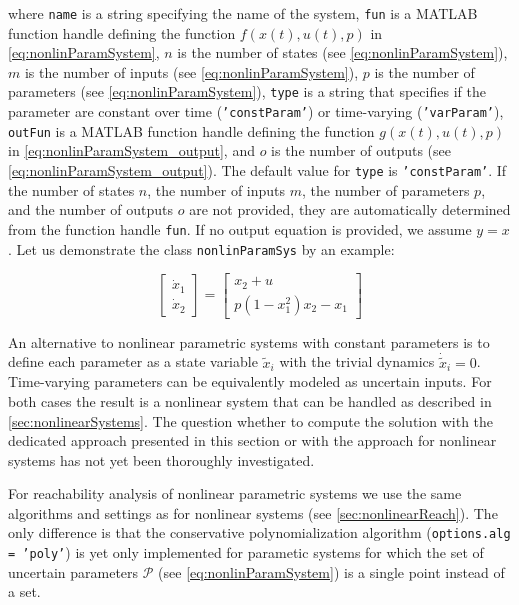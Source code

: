 where \texttt{name} is a string specifying the name of the system, \texttt{fun} is a MATLAB function handle defining the function $f(x(t),u(t),p)$ in \eqref{eq:nonlinParamSystem}, $n$ is the number of states (see \eqref{eq:nonlinParamSystem}), $m$ is the number of inputs (see \eqref{eq:nonlinParamSystem}), $p$ is the number of parameters (see \eqref{eq:nonlinParamSystem}), \texttt{type} is a string that specifies if the parameter are constant over time (\texttt{'constParam'}) or time-varying (\texttt{'varParam'}), \texttt{outFun} is a MATLAB function handle defining the function $g(x(t),u(t),p)$ in \eqref{eq:nonlinParamSystem_output}, and $o$ is the number of outputs (see \eqref{eq:nonlinParamSystem_output}). The default value for \texttt{type} is \texttt{'constParam'}. If the number of states $n$, the number of inputs $m$, the number of parameters $p$, and the number of outputs $o$ are not provided, they are automatically determined from the function handle \texttt{fun}. If no output equation is provided, we assume $y = x$. Let us demonstrate the class \texttt{nonlinParamSys} by an example:

\begin{center}
\begin{minipage}[t]{0.48\textwidth}
	\vspace{10pt}
	\begin{equation*}
	\begin{bmatrix} \dot x_1 \\ \dot x_2 \end{bmatrix} = \begin{bmatrix}  x_2 + u \\ p(1-x_1^2)x_2 - x_1 \end{bmatrix}
\end{equation*}
\end{minipage}
\begin{minipage}[t]{0.48\textwidth}
	\footnotesize
	
\end{minipage}
\end{center}

An alternative to nonlinear parametric systems with constant parameters is to define each parameter as a state variable $\tilde{x}_i$ with the trivial dynamics $\dot{\tilde{x}}_i = 0$. Time-varying parameters can be equivalently modeled as uncertain inputs. For both cases the result is a nonlinear system that can be handled as described in \cref{sec:nonlinearSystems}. The question whether to compute the solution with the dedicated approach presented in this section or with the approach for nonlinear systems has not yet been thoroughly investigated.


For reachability analysis of nonlinear parametric systems we use the same algorithms and settings as for nonlinear systems (see \cref{sec:nonlinearReach}). The only difference is that the conservative polynomialization algorithm \cite{Althoff2013a} (\texttt{options.alg = 'poly'}) is yet only implemented for parametic systems for which the set of uncertain parameters $\mathcal{P}$ (see \eqref{eq:nonlinParamSystem}) is a single point instead of a set.
